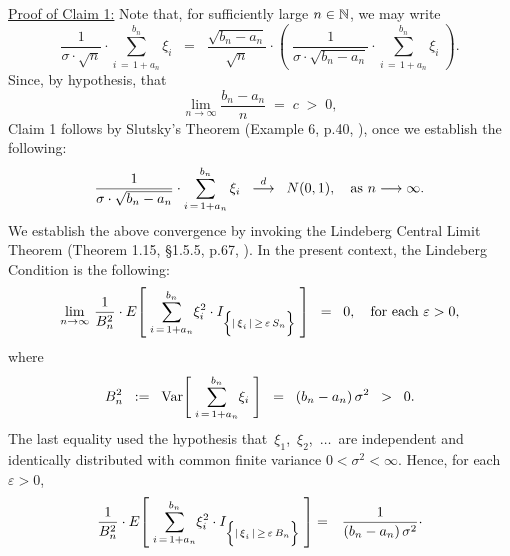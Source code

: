\begin{enumerate}
		\vskip 0.5cm
		\noindent
		\underline{Proof of Claim 1:}\quad
		Note that, for sufficiently large $n \in \mathbb{N}$, we may write
		\begin{equation*}
		\dfrac{1}{\sigma\cdot\sqrt{n}} \cdot \sum_{i\,=\,1+a_{n}}^{b_{n}}\xi_{i}
		\;\; = \;\;
		\dfrac{\sqrt{b_{n} - a_{n}}}{\sqrt{n}}\cdot
		\left(\;\dfrac{1}{\sigma\cdot\sqrt{b_{n} - a_{n}}} \cdot \sum_{i\,=\,1+a_{n}}^{b_{n}}\xi_{i}\;\right).
		\end{equation*}
		Since, by hypothesis, that
		\begin{equation*}
		\lim_{n\rightarrow\infty}\dfrac{b_{n} - a_{n}}{n} \;=\; c \;>\; 0,
		\end{equation*}
		Claim 1 follows by Slutsky's Theorem (Example 6, p.40, \cite{Ferguson1996}),
		once we establish the following:
		\begin{equation*}
		\dfrac{1}{\sigma\cdot\sqrt{b_{n} - a_{n}}} \cdot \sum_{i\,=\,1+a_{n}}^{b_{n}}\xi_{i}
		\;\; \overset{d}{\longrightarrow} \;\; N(0,1),
		\quad
		\textnormal{as $n \longrightarrow \infty$}.
		\end{equation*}
		We establish the above convergence by invoking
		the Lindeberg Central Limit Theorem (Theorem 1.15, \S1.5.5, p.67, \cite{Shao2003}).
		In the present context, the Lindeberg Condition is the following:
		\begin{eqnarray*}
		\lim_{n\rightarrow\infty}\,
		\dfrac{1}{B_{n}^{2}}\cdot
		E\!\left[\;
		\underset{i\,=\,1+a_{n}}{\overset{b_{n}}{\sum}}\xi_{i}^{2}
		\cdot
		I_{\left\{\vert\,\overset{{\color{white}.}}{\xi}_{i}\,\vert\,\geq\,\varepsilon\,S_{n}\right\}}
		\;\right]
		\;\; = \;\; 0,
		\quad
		\textnormal{for each $\varepsilon > 0$},
		\end{eqnarray*}
		where
		\begin{equation*}
		B_{n}^{2}
		\;\;:=\;\; \textnormal{Var}\!\left[\;\underset{i\,=\,1+a_{n}}{\overset{b_{n}}{\sum}}\xi_{i}\;\right]
		\;\; =\;\; (b_{n} - a_{n})\,\sigma^{2} \;\;>\;\; 0.
		\end{equation*}
		The last equality used the hypothesis that \,$\xi_{1}$,\, $\xi_{2}$,\, $\ldots$\, are independent
		and identically distributed with common finite variance $0 < \sigma^{2} < \infty$.
		Hence, for each $\varepsilon > 0$,
		\begin{eqnarray*}
		\dfrac{1}{B_{n}^{2}}\cdot
		E\!\left[\;
		\underset{i\,=\,1+a_{n}}{\overset{b_{n}}{\sum}}\xi_{i}^{2}
		\cdot
		I_{\left\{\vert\,\overset{{\color{white}.}}{\xi}_{i}\,\vert\,\geq\,\varepsilon\,B_{n}\right\}}
		\;\right]
		&=&
		\dfrac{1}{(b_{n} - a_{n})\,\sigma^{2}}
		\cdot

\end{eqnarray*}
\end{enumerate}
